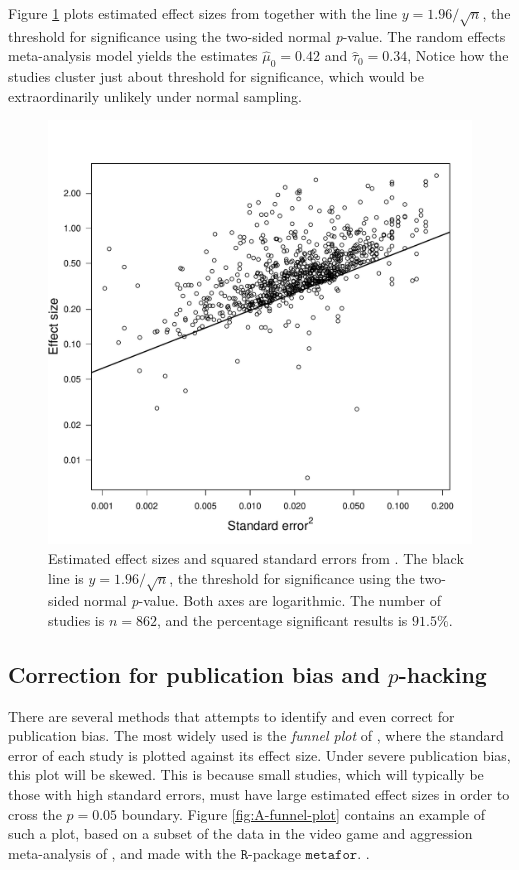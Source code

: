 Figure \ref{fig:motyl} plots estimated effect sizes from \textcite{Motyl2017-dx} together with the line $y=1.96/\sqrt{n}$, the threshold for significance using the two-sided normal \emph{p}-value. The random effects meta-analysis model yields the estimates $\hat{\mu}_{0}=0.42$ and $\hat{\tau}_{0}=0.34$, Notice how the studies cluster just about threshold for significance, which would be extraordinarily unlikely under normal sampling.
\begin{figure}
\noindent \begin{centering}
\includegraphics[scale=0.5]{chunks/motyl}
\par\end{centering}
\caption{\label{fig:motyl}Estimated effect sizes and squared standard errors from \textcite{Motyl2017-dx}. The black line is $y=1.96/\sqrt{n}$, the threshold for significance using the two-sided normal \emph{p}-value. Both axes are logarithmic. The number of studies is $n=862$, and the percentage significant results is $91.5\%$.}
\end{figure}
\subsection{Correction for publication bias and $p$-hacking}

There are several methods that attempts to identify and even correct for publication bias. The most widely used is the \emph{funnel plot} of \textcite{Egger1998-kj}, where the standard error of each study is plotted against its effect size. Under severe publication bias, this plot will be skewed. This is because small studies, which will typically be those with high standard errors, must have large estimated effect sizes in order to cross the $p=0.05$ boundary. Figure \ref{fig:A-funnel-plot} contains an example of such a plot, based on a subset of the data in the video game and aggression meta-analysis of \textcite{Anderson2010-ki}, and made with the $\mathtt{R}$-package $\mathtt{metafor}$. \parencite{viechtbauer_conducting_2010}.

